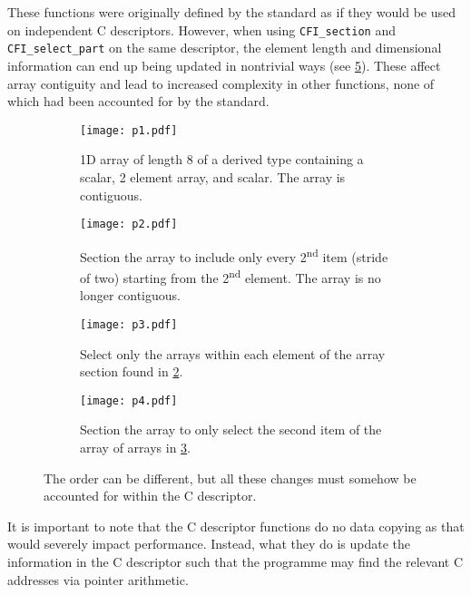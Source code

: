 These functions were originally defined by the standard as if they would be used on independent C descriptors. However, when using \texttt{CFI\_section} and \texttt{CFI\_select\_part} on the same descriptor, the element length and dimensional information can end up being updated in nontrivial ways (see \cref{f:synergy}). These affect array contiguity and lead to increased complexity in other functions, none of which had been accounted for by the standard.
\begin{figure}[t]
    \centering
    \begin{subfigure}[t]{\linewidth}
        \texttt{[image: p1.pdf]}
        \caption{1D array of length 8 of a derived type containing a scalar, 2 element array, and scalar. The array is contiguous.}
        \label{sf:synergya}
    \end{subfigure}

    \begin{subfigure}[t]{\linewidth}
        \texttt{[image: p2.pdf]}
        \caption{Section the array to include only every 2\textsuperscript{nd} item (stride of two) starting from the 2\textsuperscript{nd} element. The array is no longer contiguous.}
        \label{sf:synergyb}
    \end{subfigure}

    \begin{subfigure}[t]{\linewidth}
        \texttt{[image: p3.pdf]}
        \caption{Select only the arrays within each element of the array section found in \cref{sf:synergyb}.}
        \label{sf:synergyc}
    \end{subfigure}

    \begin{subfigure}[t]{\linewidth}
        \texttt{[image: p4.pdf]}
        \caption{Section the array to only select the second item of the array of arrays in \cref{sf:synergyc}.}
        \label{sf:synergyd}
    \end{subfigure}
    \caption{The order can be different, but all these changes must somehow be accounted for within the C descriptor.}
    \label{f:synergy}
\end{figure}

It is important to note that the C descriptor functions do no data copying as that would severely impact performance. Instead, what they do is update the information in the C descriptor such that the programme may find the relevant C addresses via pointer arithmetic.

